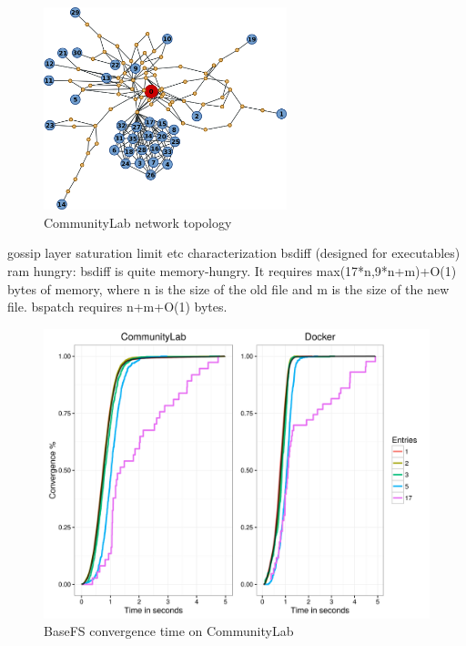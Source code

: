 \documentclass{sig-alternate}
\begin{document}
\begin{figure}[htp]
\centering
\includegraphics[width=200pt]{imgs/topology.png}
\caption{CommunityLab network topology}
\label{fig:topology}
\end{figure}

gossip layer saturation limit
etc characterization
    bsdiff (designed for executables) ram hungry: bsdiff is quite memory-hungry. It requires max(17*n,9*n+m)+O(1) bytes of memory, where n is the size of the old file and m is the size of the new file. bspatch requires n+m+O(1) bytes.



\begin{figure}[htp]
\centering
\includegraphics[width=\columnwidth]{../eval/plots/basefs.png}
\caption{BaseFS convergence time on CommunityLab}
\label{fig:basefs}
\end{figure}
\end{document}
